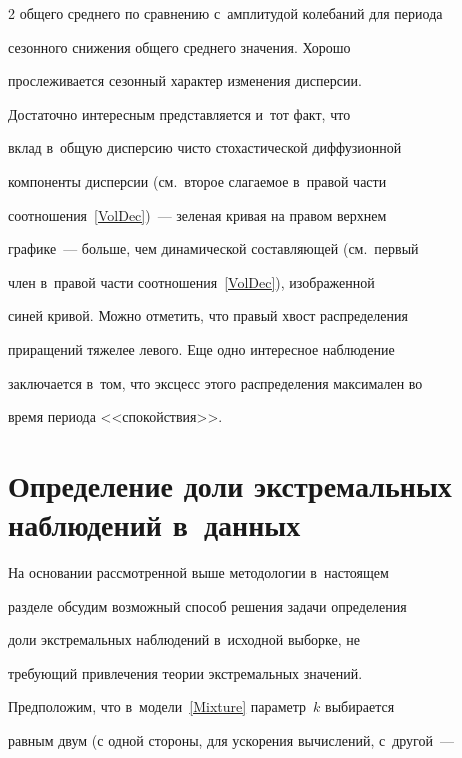\begin{multicols}{2}
общего среднего по сравнению с~амплитудой колебаний для периода


сезонного снижения общего среднего значения. Хорошо


прослеживается сезонный характер изменения дисперсии.


Достаточно интересным представляется и~тот факт, что


вклад в~общую дис\-пер\-сию чисто стохастической диффузионной


компоненты дис\-пер\-сии (см.\ второе слагаемое в~правой части


соотношения~\eqref{VolDec})~--- зеленая кривая на правом верхнем


графике~---  больше, чем динамической составляющей (см.\ первый


член в~правой части соотношения~\eqref{VolDec}), изображенной


синей кривой. Можно отметить, что правый хвост распределения


приращений тяжелее левого. Еще одно интересное наблюдение


заключается в~том, что эксцесс этого распределения максимален во


время периода <<спокой\-ствия>>.


{





}








\section{Определение доли экстремальных наблюдений в~данных}





На основании рассмотренной выше методологии в~настоящем


разделе обсудим возможный способ решения задачи определения


доли экстремальных наблюдений в~исходной выборке, не


\mbox{тре\-бу\-ющий} привлечения теории экстремальных значений.





Предположим, что в~модели~\eqref{Mixture} параметр~$k$ выбирается


равным двум (с одной стороны, для ускорения вычислений, с~другой~---  



\end{multicols}
